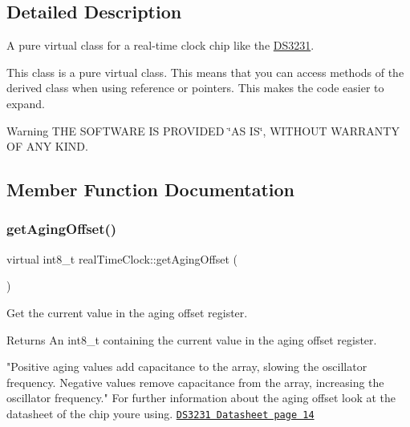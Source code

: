 \subsection{Detailed Description}
A pure virtual class for a real-\/time clock chip like the \mbox{\hyperlink{class_d_s3231}{D\+S3231}}. 

This class is a pure virtual class. This means that you can access methods of the derived class when using reference or pointers. This makes the code easier to expand. \begin{DoxyWarning}{Warning}
T\+HE S\+O\+F\+T\+W\+A\+RE IS P\+R\+O\+V\+I\+D\+ED \char`\"{}\+A\+S I\+S\char`\"{}, W\+I\+T\+H\+O\+UT W\+A\+R\+R\+A\+N\+TY OF A\+NY K\+I\+ND. 
\end{DoxyWarning}


\subsection{Member Function Documentation}
\mbox{\label{classreal_time_clock_a2bc081385a6ad8273201d66217f8b2f0}} 
\subsubsection{\texorpdfstring{get\+Aging\+Offset()}{getAgingOffset()}}
{\footnotesize\ttfamily virtual int8\+\_\+t real\+Time\+Clock\+::get\+Aging\+Offset (\begin{DoxyParamCaption}{ }\end{DoxyParamCaption})\hspace{0.3cm}{\ttfamily [pure virtual]}}



Get the current value in the aging offset register. 

\begin{DoxyReturn}{Returns}
An int8\+\_\+t containing the current value in the aging offset register.
\end{DoxyReturn}
"Positive aging values add capacitance to the array, slowing the oscillator frequency. Negative values remove capacitance from the array, increasing the oscillator frequency." For further information about the aging offset look at the datasheet of the chip you\textquotesingle{}re using. \href{https://datasheets.maximintegrated.com/en/ds/DS3231.pdf}{\tt D\+S3231 Datasheet page 14} 

